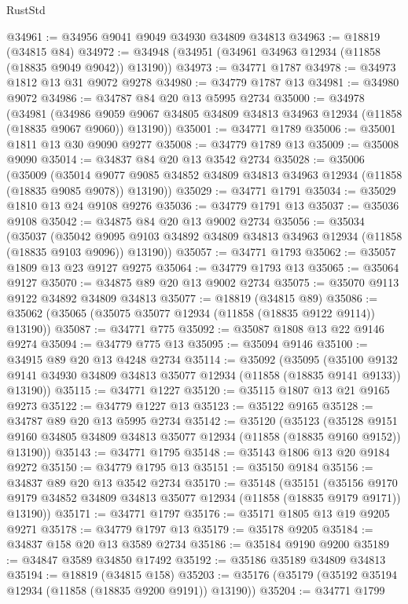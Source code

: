 \begin{lexlean}{RustStd}
\begin{coremodule}
@34961 := @34956 @9041 @9049 @34930 @34809 @34813
@34963 := @18819 (@34815 @84)
@34972 := @34948 (@34951 (@34961 @34963 @12934 (@11858 (@18835 @9049 @9042)) @13190))
@34973 := @34771 @1787
@34978 := @34973 @1812 @13 @31 @9072 @9278
@34980 := @34779 @1787 @13
@34981 := @34980 @9072
@34986 := @34787 @84 @20 @13 @5995 @2734
@35000 := @34978
    (@34981
      (@34986 @9059 @9067 @34805 @34809 @34813 @34963 @12934 (@11858 (@18835 @9067 @9060)) @13190))
@35001 := @34771 @1789
@35006 := @35001 @1811 @13 @30 @9090 @9277
@35008 := @34779 @1789 @13
@35009 := @35008 @9090
@35014 := @34837 @84 @20 @13 @3542 @2734
@35028 := @35006
    (@35009
      (@35014 @9077 @9085 @34852 @34809 @34813 @34963 @12934 (@11858 (@18835 @9085 @9078)) @13190))
@35029 := @34771 @1791
@35034 := @35029 @1810 @13 @24 @9108 @9276
@35036 := @34779 @1791 @13
@35037 := @35036 @9108
@35042 := @34875 @84 @20 @13 @9002 @2734
@35056 := @35034
    (@35037
      (@35042 @9095 @9103 @34892 @34809 @34813 @34963 @12934 (@11858 (@18835 @9103 @9096)) @13190))
@35057 := @34771 @1793
@35062 := @35057 @1809 @13 @23 @9127 @9275
@35064 := @34779 @1793 @13
@35065 := @35064 @9127
@35070 := @34875 @89 @20 @13 @9002 @2734
@35075 := @35070 @9113 @9122 @34892 @34809 @34813
@35077 := @18819 (@34815 @89)
@35086 := @35062 (@35065 (@35075 @35077 @12934 (@11858 (@18835 @9122 @9114)) @13190))
@35087 := @34771 @775
@35092 := @35087 @1808 @13 @22 @9146 @9274
@35094 := @34779 @775 @13
@35095 := @35094 @9146
@35100 := @34915 @89 @20 @13 @4248 @2734
@35114 := @35092
    (@35095
      (@35100 @9132 @9141 @34930 @34809 @34813 @35077 @12934 (@11858 (@18835 @9141 @9133)) @13190))
@35115 := @34771 @1227
@35120 := @35115 @1807 @13 @21 @9165 @9273
@35122 := @34779 @1227 @13
@35123 := @35122 @9165
@35128 := @34787 @89 @20 @13 @5995 @2734
@35142 := @35120
    (@35123
      (@35128 @9151 @9160 @34805 @34809 @34813 @35077 @12934 (@11858 (@18835 @9160 @9152)) @13190))
@35143 := @34771 @1795
@35148 := @35143 @1806 @13 @20 @9184 @9272
@35150 := @34779 @1795 @13
@35151 := @35150 @9184
@35156 := @34837 @89 @20 @13 @3542 @2734
@35170 := @35148
    (@35151
      (@35156 @9170 @9179 @34852 @34809 @34813 @35077 @12934 (@11858 (@18835 @9179 @9171)) @13190))
@35171 := @34771 @1797
@35176 := @35171 @1805 @13 @19 @9205 @9271
@35178 := @34779 @1797 @13
@35179 := @35178 @9205
@35184 := @34837 @158 @20 @13 @3589 @2734
@35186 := @35184 @9190 @9200
@35189 := @34847 @3589 @34850 @17492
@35192 := @35186 @35189 @34809 @34813
@35194 := @18819 (@34815 @158)
@35203 := @35176 (@35179 (@35192 @35194 @12934 (@11858 (@18835 @9200 @9191)) @13190))
@35204 := @34771 @1799

\end{coremodule}
\end{lexlean}
